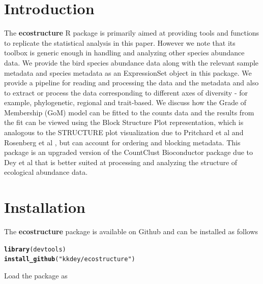 \documentclass[12pt]{article}\usepackage[]{graphicx}\usepackage[usenames,dvipsnames]{color}
\makeatletter
\newcommand{\hlstr}[1]{\textcolor[rgb]{0.192,0.494,0.8}{#1}}%
\newcommand{\hlstd}[1]{\textcolor[rgb]{0.345,0.345,0.345}{#1}}%
\newcommand{\hlkwd}[1]{\textcolor[rgb]{0.737,0.353,0.396}{\textbf{#1}}}%
\newenvironment{kframe}{%
 \def\at@end@of@kframe{}%
 \ifinner\ifhmode%
  \def\at@end@of@kframe{\end{minipage}}%
  \begin{minipage}{\columnwidth}%
 \fi\fi%
 \def\FrameCommand##1{\hskip\@totalleftmargin \hskip-\fboxsep
 \colorbox{shadecolor}{##1}\hskip-\fboxsep
     \hskip-\linewidth \hskip-\@totalleftmargin \hskip\columnwidth}%
 \MakeFramed {\advance\hsize-\width
   \@totalleftmargin\z@ \linewidth\hsize
   \@setminipage}}%
 {\par\unskip\endMakeFramed%
 \at@end@of@kframe}
\newenvironment{knitrout}{}{} %
\makeatother
\begin{document}
\maketitle

\section{Introduction}

The \textbf{ecostructure} R package is primarily aimed at providing tools and functions to replicate the statistical analysis in this paper. However we note that its toolbox is generic enough in handling and analyzing other species abundance data. We provide the bird species abundance data along with the relevant sample metadata and species metadata as an ExpressionSet object in this package. We provide a pipeline for reading and processing the data and the metadata and also to extract or process the data corresponding to different axes of diversity - for example, phylogenetic, regional and trait-based. We discuss how the Grade of Membership (GoM) model can be fitted to the counts data and the results from the fit can be viewed using the Block Structure Plot representation, which is analogous to the STRUCTURE plot visualization due to Pritchard et al \cite{Pritchard2000} and Rosenberg et al \cite{Rosenberg2002}, but can account for ordering and blocking metadata. This package is an upgraded version of the CountClust Bioconductor package due to Dey et al \cite{Dey2016} that is better suited at processing and analyzing the structure of ecological abundance data.

\section{Installation}

The \textbf{ecostructure} package is available on Github and can be installed as follows



\begin{knitrout}
\color{fgcolor}\begin{kframe}
\begin{alltt}
\hlkwd{library}\hlstd{(devtools)}
\hlkwd{install_github}\hlstd{(}\hlstr{"kkdey/ecostructure"}\hlstd{)}
\end{alltt}
\end{kframe}
\end{knitrout}

Load the package as
\end{document}
